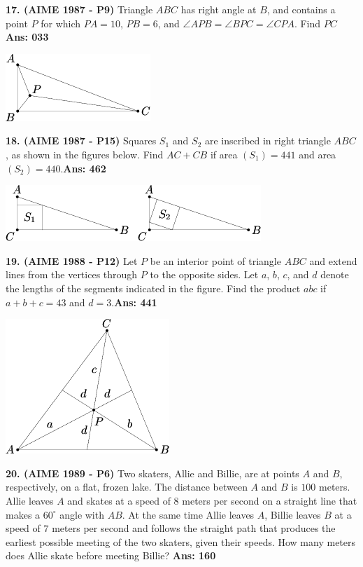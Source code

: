 \documentclass[letterpaper,10pt,addpoints]{exam}
\begin{document}
\textbf{17. (AIME 1987 - P9) } Triangle $ABC$ has right angle at $B$, and contains a point $P$ for which $PA = 10$, $PB = 6$, and $\angle APB = \angle BPC = \angle CPA$. Find $PC$\quad  \textbf{Ans: 033}

\begin{center}
\includegraphics[scale=0.6]{AIME_1987_Problem_9.png}
\end{center}

\textbf{18. (AIME 1987 - P15) } Squares $S_1$ and $S_2$ are inscribed in right triangle $ABC$, as shown in the figures below. Find $AC + CB$ if area $(S_1) = 441$ and area $(S_2) = 440$.\quad  \textbf{Ans: 462}

\begin{center}
\includegraphics[scale=0.6]{AIME_1987_Problem_15.png}
\end{center}

\textbf{19. (AIME 1988 - P12) } Let $P$ be an interior point of triangle $ABC$ and extend lines from the vertices through $P$ to the opposite sides. Let $a$, $b$, $c$, and $d$ denote the lengths of the segments indicated in the figure. Find the product $abc$ if $a + b + c = 43$ and $d = 3$.\quad  \textbf{Ans: 441}

\begin{center}
\includegraphics[scale=0.6]{1988_AIME-12.png}
\end{center}

\textbf{20. (AIME 1989 - P6) } Two skaters, Allie and Billie, are at points $A$ and $B$, respectively, on a flat, frozen lake. The distance between $A$ and $B$ is $100$ meters. Allie leaves $A$ and skates at a speed of $8$ meters per second on a straight line that makes a $60^\circ$ angle with $AB$. At the same time Allie leaves $A$, Billie leaves $B$ at a speed of $7$ meters per second and follows the straight path that produces the earliest possible meeting of the two skaters, given their speeds. How many meters does Allie skate before meeting Billie? \textbf{Ans: 160}
\end{document}
